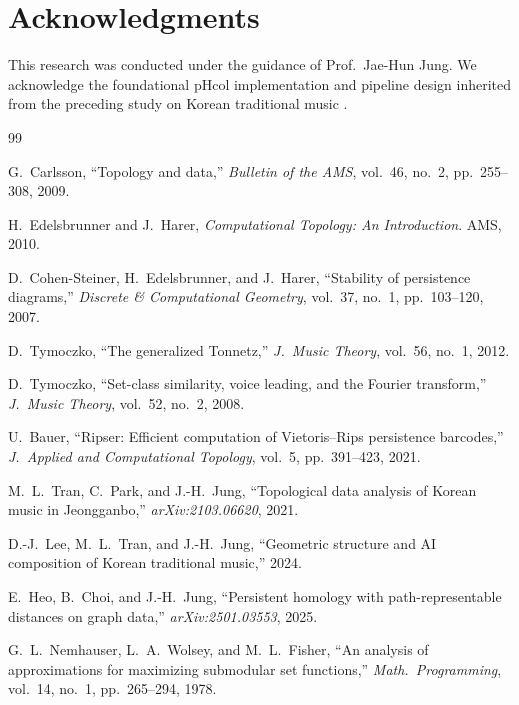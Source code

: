 \documentclass[conference,10pt,a4paper]{IEEEtran}
\begin{document}
\section*{Acknowledgments}

This research was conducted under the guidance of Prof.~Jae-Hun Jung.
We acknowledge
the foundational pHcol implementation and pipeline design inherited from
the preceding study on Korean traditional music \cite{lee2024}.


\begin{thebibliography}{99}

G.~Carlsson, ``Topology and data,''
\emph{Bulletin of the AMS}, vol.~46, no.~2, pp.~255--308, 2009.

H.~Edelsbrunner and J.~Harer,
\emph{Computational Topology: An Introduction}. AMS, 2010.

D.~Cohen-Steiner, H.~Edelsbrunner, and J.~Harer,
``Stability of persistence diagrams,''
\emph{Discrete \& Computational Geometry}, vol.~37, no.~1,
pp.~103--120, 2007.

D.~Tymoczko, ``The generalized Tonnetz,''
\emph{J.\ Music Theory}, vol.~56, no.~1, 2012.

D.~Tymoczko, ``Set-class similarity, voice leading, and the Fourier
transform,'' \emph{J.\ Music Theory}, vol.~52, no.~2, 2008.

U.~Bauer, ``Ripser: Efficient computation of Vietoris--Rips persistence
barcodes,'' \emph{J.\ Applied and Computational Topology}, vol.~5,
pp.~391--423, 2021.

M.~L.~Tran, C.~Park, and J.-H.~Jung, ``Topological data analysis of
Korean music in Jeongganbo,'' \emph{arXiv:2103.06620}, 2021.

D.-J.~Lee, M.~L.~Tran, and J.-H.~Jung, ``Geometric structure and AI
composition of Korean traditional music,'' 2024.

E.~Heo, B.~Choi, and J.-H.~Jung, ``Persistent homology with
path-representable distances on graph data,''
\emph{arXiv:2501.03553}, 2025.

G.~L.~Nemhauser, L.~A.~Wolsey, and M.~L.~Fisher, ``An analysis of
approximations for maximizing submodular set functions,''
\emph{Math.\ Programming}, vol.~14, no.~1, pp.~265--294, 1978.


\end{thebibliography}
\end{document}
